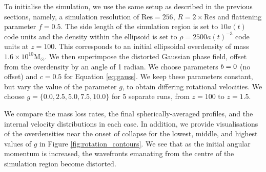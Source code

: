 \documentclass[a4paper,11pt]{article}
\begin{document}
To initialise the simulation, we use the same setup as described in the previous sections, namely, a simulation resolution of $\mathrm{Res} = 256$, $R = 2 \times \mathrm{Res}$ and flattening parameter $f=0.5$. The side length of the simulation region is set to $10a(t)$ code units and the density within the ellipsoid is set to $\rho = 2500a(t)^{-3}$ code units at $z=100$. This corresponds to an initial ellipsoidal overdensity of mass $1.6 \times 10^{10}$M$_\odot$. We then superimpose the distorted Gaussian phase field, offset from the overdensity by an angle of 1 radian. We choose parameters $\boldmath{b} = 0$ (no offset) and $c = 0.5$ for Equation \ref{eq:gauss}. We keep these parameters constant, but vary the value of the parameter $g$, to obtain differing rotational velocities. We choose $g = \{0.0, 2.5, 5.0, 7.5, 10.0\}$ for 5 separate runs, from $z=100$ to $z=1.5$. 

We compare the mass loss rates, the final spherically-averaged profiles, and the internal velocity distributions in each case. In addition, we provide visualisations of the overdensities near the onset of collapse for the lowest, middle, and highest values of $g$ in Figure \ref{fig:rotation_contours}. We see that as the initial angular momentum is increased, the wavefronts emanating from the centre of the simulation region become distorted. 
\end{document}
